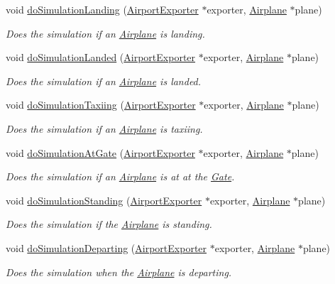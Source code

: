 \begin{DoxyCompactItemize}
void \mbox{\hyperlink{class_airport_a42d696dbd56340c324c385945045f402}{do\+Simulation\+Landing}} (\mbox{\hyperlink{class_airport_exporter}{Airport\+Exporter}} $\ast$exporter, \mbox{\hyperlink{class_airplane}{Airplane}} $\ast$plane)
\begin{DoxyCompactList}\small\item\em Does the simulation if an \mbox{\hyperlink{class_airplane}{Airplane}} is landing. \end{DoxyCompactList}\item 
void \mbox{\hyperlink{class_airport_aaecef9cb812cbd5fb6aa64ee357190c9}{do\+Simulation\+Landed}} (\mbox{\hyperlink{class_airport_exporter}{Airport\+Exporter}} $\ast$exporter, \mbox{\hyperlink{class_airplane}{Airplane}} $\ast$plane)
\begin{DoxyCompactList}\small\item\em Does the simulation if an \mbox{\hyperlink{class_airplane}{Airplane}} is landed. \end{DoxyCompactList}\item 
void \mbox{\hyperlink{class_airport_a473d89e33cae2358008a96652c2e68c2}{do\+Simulation\+Taxiing}} (\mbox{\hyperlink{class_airport_exporter}{Airport\+Exporter}} $\ast$exporter, \mbox{\hyperlink{class_airplane}{Airplane}} $\ast$plane)
\begin{DoxyCompactList}\small\item\em Does the simulation if an \mbox{\hyperlink{class_airplane}{Airplane}} is taxiing. \end{DoxyCompactList}\item 
void \mbox{\hyperlink{class_airport_a28e88d341009ceb9e8b4287fb06db3c9}{do\+Simulation\+At\+Gate}} (\mbox{\hyperlink{class_airport_exporter}{Airport\+Exporter}} $\ast$exporter, \mbox{\hyperlink{class_airplane}{Airplane}} $\ast$plane)
\begin{DoxyCompactList}\small\item\em Does the simulation if an \mbox{\hyperlink{class_airplane}{Airplane}} is at at the \mbox{\hyperlink{class_gate}{Gate}}. \end{DoxyCompactList}\item 
void \mbox{\hyperlink{class_airport_aa27fbfad60f1e3ae54aa656d34b86ba2}{do\+Simulation\+Standing}} (\mbox{\hyperlink{class_airport_exporter}{Airport\+Exporter}} $\ast$exporter, \mbox{\hyperlink{class_airplane}{Airplane}} $\ast$plane)
\begin{DoxyCompactList}\small\item\em Does the simulation if the \mbox{\hyperlink{class_airplane}{Airplane}} is standing. \end{DoxyCompactList}\item 
void \mbox{\hyperlink{class_airport_aa218b5ef42ae4d1d61b40377874bd4ca}{do\+Simulation\+Departing}} (\mbox{\hyperlink{class_airport_exporter}{Airport\+Exporter}} $\ast$exporter, \mbox{\hyperlink{class_airplane}{Airplane}} $\ast$plane)
\begin{DoxyCompactList}\small\item\em Does the simulation when the \mbox{\hyperlink{class_airplane}{Airplane}} is departing. \end{DoxyCompactList}\end{DoxyCompactItemize}


